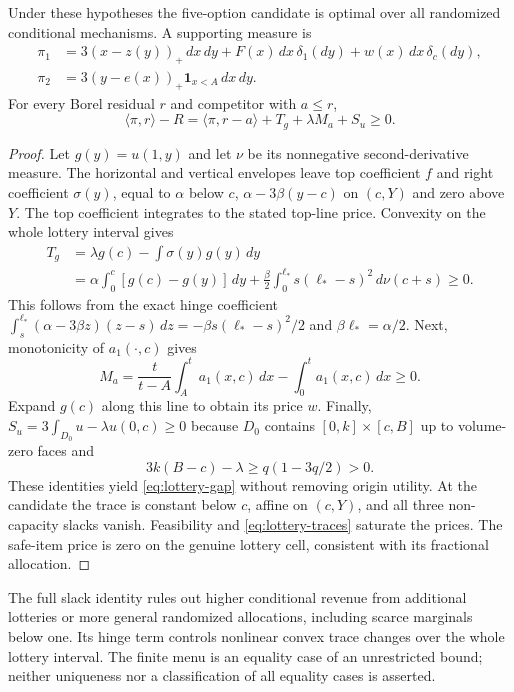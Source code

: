 \begin{theorem}\label{thm:lottery}
Under these hypotheses the five-option candidate is optimal over all
randomized conditional mechanisms. A supporting measure is
\[
\begin{aligned}
\pi_1&=3(x-z(y))_+\,dx\,dy+F(x)\,dx\,\delta_1(dy)
                         +w(x)\,dx\,\delta_c(dy),\\
\pi_2&=3(y-e(x))_+\mathbf1_{x<A}\,dx\,dy.
\end{aligned}
\]
For every Borel residual $r$ and competitor with $a\le r$,
\begin{equation}\label{eq:lottery-gap}
\langle\pi,r\rangle-R
 =\langle\pi,r-a\rangle+T_g+\lambda M_a+S_u\ge0.
\end{equation}
\end{theorem}
\begin{proof}
Let $g(y)=u(1,y)$ and let $\nu$ be its nonnegative second-derivative
measure. The horizontal and vertical envelopes leave top coefficient $f$
and right coefficient $\sigma(y)$, equal to $\alpha$ below $c$,
$\alpha-3\beta(y-c)$ on $(c,Y)$ and zero above $Y$.
The top coefficient integrates to the stated top-line price. Convexity on
the whole lottery interval gives
\[
\begin{split}
T_g&=\lambda g(c)-\int\sigma(y)g(y)\,dy\\
&=\alpha\int_0^c[g(c)-g(y)]\,dy
 +\frac\beta2\int_0^{\ell_*}s(\ell_*-s)^2\,d\nu(c+s)\ge0.
\end{split}
\]
This follows from the exact hinge coefficient
$\int_s^{\ell_*}(\alpha-3\beta z)(z-s)\,dz
=-\beta s(\ell_*-s)^2/2$ and $\beta\ell_*=\alpha/2$.
Next, monotonicity of $a_1(\cdot,c)$ gives
\[
M_a=\frac{t}{t-A}\int_A^t a_1(x,c)\,dx-
                     \int_0^t a_1(x,c)\,dx\ge0.
\]
Expand $g(c)$ along this line to obtain its price $w$.
Finally,
$S_u=3\int_{D_0}u-\lambda u(0,c)\ge0$ because
$D_0$ contains $[0,k]\times[c,B]$ up to volume-zero faces and
\[
3k(B-c)-\lambda\ge q(1-3q/2)>0.
\]
These identities yield \eqref{eq:lottery-gap} without removing origin
utility. At the candidate the trace is constant below $c$, affine on
$(c,Y)$, and all three non-capacity slacks vanish. Feasibility and
\eqref{eq:lottery-traces} saturate the prices. The safe-item price is zero
on the genuine lottery cell, consistent with its fractional allocation.
\end{proof}

The full slack identity rules out higher conditional revenue from additional
lotteries or more general randomized allocations, including scarce marginals
below one. Its hinge term controls nonlinear convex trace changes over the
whole lottery interval. The finite menu is an equality case of an unrestricted
bound; neither uniqueness nor a classification of all equality cases is asserted.

